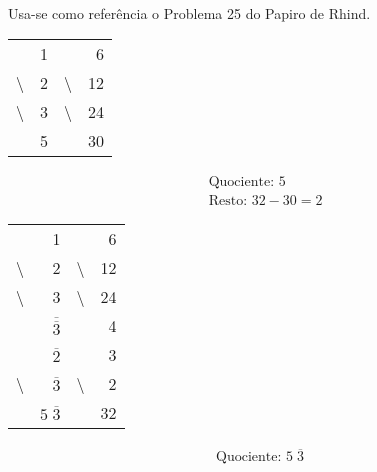 
\paragraph{} Usa-se como referência o Problema 25 do Papiro de
Rhind\parencite[pág.29]{Estrada2000}.

\vspace{0.5cm}


\begin{table}[h]
	\centering
	\begin{tabular}{cr|cr}
		&1&&6\\
		\textbackslash&2&\textbackslash&12\\
		\textbackslash&3&\textbackslash&24\\
		\hline
		&5&&30
	\end{tabular}
\end{table}

\begin{align*}
	&\text{Quociente: } 5 \\
	&\text{Resto: } 32 - 30 = 2
\end{align*}


\begin{table}[h]
	\centering
	\begin{tabular}{cr|cr}
		&1&&6\\
		\textbackslash&2&\textbackslash&12\\
		\textbackslash&3&\textbackslash&24\\
		&$\overline{\overline{3}}$&&4\\
		&$\overline{2}$&&3\\
		\textbackslash&$\overline{3}$&\textbackslash&2\\
		\hline
		&$5 \; \overline{3}$&&32
	\end{tabular}
\end{table}

\begin{align*}
	\text{Quociente: } 5 \; \overline{3}
\end{align*}

